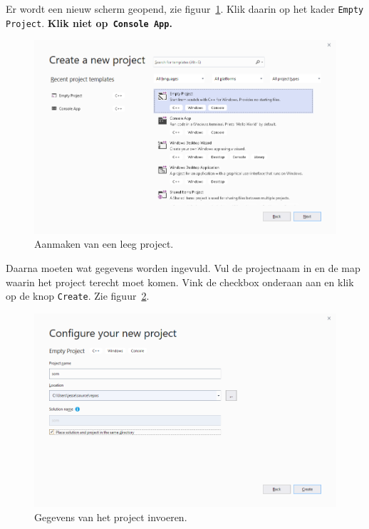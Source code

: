 \documentclass[a4paper,10pt,fleqn,twoside]{article}
\begin{document}
Er wordt een nieuw scherm geopend, zie figuur~\ref{fig:002create}. Klik daarin op het kader \texttt{Empty Project}. \textbf{Klik niet op\texttt{ Console App}.}

\begin{figure}[H]
\centering
\includegraphics[scale=0.5]{002create}
\caption{Aanmaken van een leeg project.}
\label{fig:002create}
\end{figure}

Daarna moeten wat gegevens worden ingevuld. Vul de projectnaam in en de map waarin het project terecht moet komen. Vink de checkbox onderaan aan en klik op de knop \texttt{Create}. Zie figuur~\ref{fig:003configure}.

\begin{figure}[H]
\centering
\includegraphics[scale=0.5]{003configure}
\caption{Gegevens van het project invoeren.}
\label{fig:003configure}
\end{figure}
\end{document}
